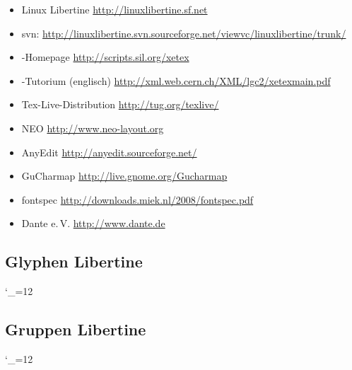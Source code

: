 \documentclass{fontdoku}
\begin{document}
\begin{itemize}
   \item Linux Libertine \hfill\url{http://linuxlibertine.sf.net}
   \item svn: \hfill
         \url{http://linuxlibertine.svn.sourceforge.net/viewvc/linuxlibertine/trunk/}
   \item \XeTeX-Homepage \hfill\url{http://scripts.sil.org/xetex}
   \item \XeTeX-Tutorium (englisch) \hfill\url{http://xml.web.cern.ch/XML/lgc2/xetexmain.pdf}
   \item Tex-Live-Distribution \hfill\url{http://tug.org/texlive/}
   \item NEO \hfill\url{http://www.neo-layout.org}
   \item AnyEdit \hfill\url{http://anyedit.sourceforge.net/}
   \item GuCharmap \hfill\url{http://live.gnome.org/Gucharmap}
   \item fontspec \hfill\url{http://downloads.miek.nl/2008/fontspec.pdf}
   \item Dante e.\,V. \hfill\url{http://www.dante.de}
\end{itemize}

\newpage
\subsection{Glyphen Libertine}

{%
\setlength{\columnseprule}{.5pt}
\setlength{\columnsep}{1cm}
\begin{multicols}{3}
   \newcommand{\GYLPHNAME}[1]{\sindex[Lglyph]{#1}%
   \makebox[3cm][l]{\hypertarget{glyph.#1}{}\hyperlink{gglyph.#1}{#1}}\hfill%
   {\Huge\fbox{\Lglyph{#1}\strut}}\hfill\mbox{}\newline}
   \catcode`\_=12%
\end{multicols}
}


\newpage
\subsection{Gruppen Libertine}
{\setlength{\columnseprule}{.5pt}
\setlength{\columnsep}{1cm}
\catcode`\_=12%
\newcommand{\GROUPHEAD}[1]{\begin{multicols}{3}[\subsubsection{#1}]}
\newcommand{\GROUPFOOT}{\end{multicols}}
\newcommand{\GROUPGLYPH}[2]{\sindex[Lglyph]{#2}%
   \makebox[3cm][l]{\hyperlink{glyph.#2}{#2}\hypertarget{gglyph.#2}{}{ \small(0x#1)}}%
   \hfill{\Huge\Lglyph{#2}\strut}\hfill\mbox{}\newline}
}
\end{document}
